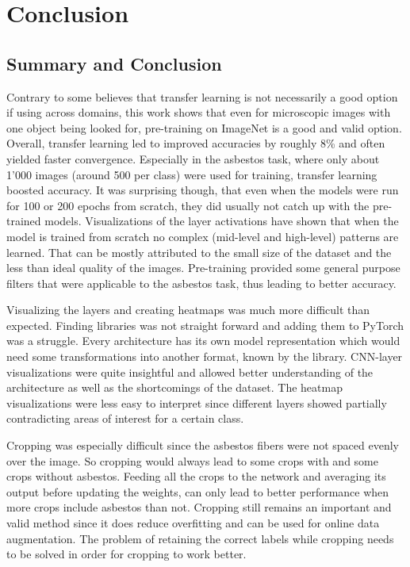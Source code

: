 \chapter{Conclusion}

\section{Summary and Conclusion}

Contrary to some believes that transfer learning is not necessarily a good option if using across domains, this work shows that even for microscopic images with one object being looked for, pre-training on ImageNet is a good and valid option. Overall, transfer learning led to improved accuracies by roughly 8\% and often yielded faster convergence. Especially in the asbestos task, where only about 1'000 images (around 500 per class) were used for training, transfer learning boosted accuracy. It was surprising though, that even when the models were run for 100 or 200 epochs from scratch, they did usually not catch up with the pre-trained models. Visualizations of the layer activations have shown that when the model is trained from scratch no complex (mid-level and high-level) patterns are learned. That can be mostly attributed to the small size of the dataset and the less than ideal quality of the images. Pre-training provided some general purpose filters that were applicable to the asbestos task, thus leading to better accuracy.

Visualizing the layers and creating heatmaps was much more difficult than expected. Finding libraries was not straight forward and adding them to PyTorch was a struggle. Every architecture has its own model representation which would need some transformations into another format, known by the library. CNN-layer visualizations were quite insightful and allowed better understanding of the architecture as well as the shortcomings of the dataset. The heatmap visualizations were less easy to interpret since different layers showed partially contradicting areas of interest for a certain class.

Cropping was especially difficult since the asbestos fibers were not spaced evenly over the image. So cropping would always lead to some crops with and some crops without asbestos. Feeding all the crops to the network and averaging its output before updating the weights, can only lead to better performance when more crops include asbestos than not. Cropping still remains an important and valid method since it does reduce overfitting and can be used for online data augmentation. The problem of retaining the correct labels while cropping needs to be solved in order for cropping to work better.

